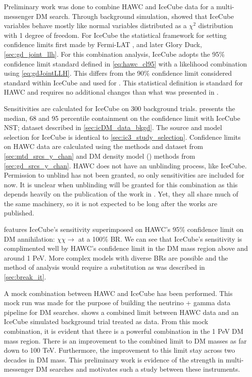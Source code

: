 Preliminary work was done to combine HAWC and IceCube data for a multi-messenger DM search.
Through background simulation,  showed that IceCube variables behave mostly like normal variables distributed as a $\chi^2$ distribution with 1 degree of freedom.
For IceCube the statistical framework for setting confidence limits first made by Fermi-LAT \cite{FermiLAT:dm1}, and later Glory Duck, \cref{sec:gd_joint_llh}.
For this combination analysis, IceCube adopts the 95\% confidence limit standard defined in \cref{eq:hawc_cl95} with a likelihood combination using \cref{eq:gdJointLLH}.
This differs from the 90\% confidence limit considered standard within IceCube and used for .
This statistical definition is standard for HAWC and requires no additional changes than what was presented in .

Sensitivities are calculated for IceCube on 300 background trials.  presents the median, 68 and 95 percentile containment on the confidence limit with IceCube NST; dataset described in \cref{sec:icDM_data_bkgd}.
The source and model selection for IceCube is identical to \cref{sec:ic3_study_selection}.
Confidence limits on HAWC data are calculated using the methods and dataset from \cref{sec:mtd_srcs_y_chan} and DM density model (\GS) methods from \cref{sec:gd_srcs_y_chan}.
HAWC does not have an unblinding process, like IceCube.
Permission to unblind has not been granted, so only sensitivities are included for now.
It is unclear when unblinding will be granted for this combination as this depends heavily on the publication of the work in .
Yet, they all share much of the same machinery, so it is not expected to be long after the works are published.

 features IceCube's sensitivity superimposed on HAWC's 95\% confidence limit on DM annihilation: $\chi\chi \rightarrow$ \parpar{\nu_\mu} at a 100\% BR.
We can see that IceCube's sensitivity is complimented well by HAWC's confidence limit in the DM mass region above and around 1 PeV.
More complex models with diverse BRs are possible and the method of analysis would require a substitution as was described in \cref{sec:break_it}.

A mock combination between HAWC and IceCube has been performed.
This mock run was made for the purpose of building the neutrino + gamma data pipeline for DM searches.
 shows a combined limit between HAWC data and an IceCube simulated background trial treated as data.
From this mock combination, it is evident that there is a powerful combination in the 1 PeV DM mass region.
There is an improvement to the combined limit to DM masses as far down to 100 TeV.
Furthermore, the improvement to this limit stay across two decades in DM mass.
This preliminary work is evidence of the strength in multi-messenger DM searches and motivates such a study between these instruments.

